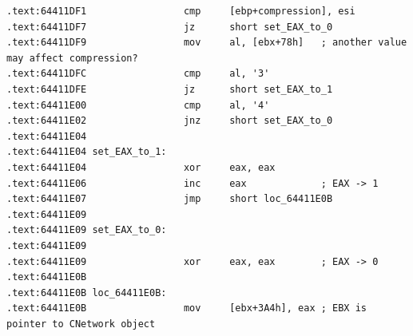 \begin{lstlisting}
.text:64411DF1                 cmp     [ebp+compression], esi
.text:64411DF7                 jz      short set_EAX_to_0
.text:64411DF9                 mov     al, [ebx+78h]   ; another value may affect compression?
.text:64411DFC                 cmp     al, '3'
.text:64411DFE                 jz      short set_EAX_to_1
.text:64411E00                 cmp     al, '4'
.text:64411E02                 jnz     short set_EAX_to_0
.text:64411E04
.text:64411E04 set_EAX_to_1:
.text:64411E04                 xor     eax, eax
.text:64411E06                 inc     eax             ; EAX -> 1
.text:64411E07                 jmp     short loc_64411E0B
.text:64411E09
.text:64411E09 set_EAX_to_0:
.text:64411E09
.text:64411E09                 xor     eax, eax        ; EAX -> 0
.text:64411E0B
.text:64411E0B loc_64411E0B:
.text:64411E0B                 mov     [ebx+3A4h], eax ; EBX is pointer to CNetwork object
\end{lstlisting}



